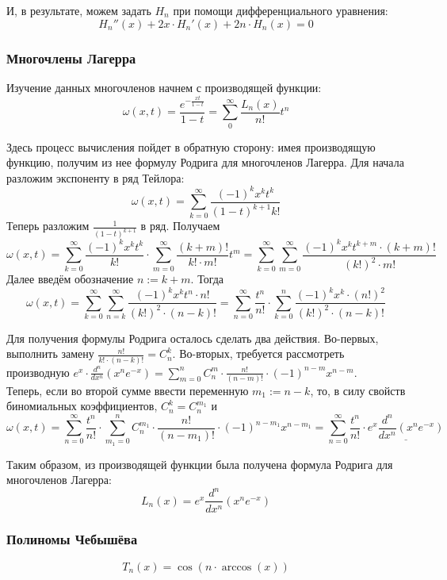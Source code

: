 \documentclass[12pt]{article}
\begin{document}
	И, в результате, можем задать $H_n$ при помощи дифференциального уравнения:
	$$H_n''(x) + 2x \cdot H_n'(x) + 2n \cdot H_n(x) = 0$$
	
	\subsubsection{Многочлены Лагерра}
	
	Изучение данных многочленов начнем с производящей функции:
	$$ \omega(x,t) = \frac{e^{-\frac{xt}{1-t}}}{1 - t} = \sum_0^{\infty} \frac{L_n(x)}{n!} t^n$$
	
	Здесь процесс вычисления пойдет в обратную сторону: имея производящую функцию, получим из нее формулу Родрига для
	многочленов Лагерра. Для начала разложим экспоненту в ряд Тейлора:
	$$ \omega(x,t) = \sum_{k=0}^{\infty} \frac{(-1)^k x^k t^k}{(1-t)^{k+1} k!}$$
	Теперь разложим $\frac{1}{(1-t)^{k+1}}$ в ряд. Получаем
	$$ \omega(x,t) = \sum_{k=0}^{\infty} \frac{(-1)^k x^k t^k}{k!} \cdot \sum_{m=0}^{\infty} \frac{(k+m)!}{k! \cdot m!} t^m
	 = \sum_{k=0}^{\infty} \sum_{m=0}^{\infty} \frac{(-1)^k x^k t^{k+m} \cdot (k+m)!}{(k!)^2 \cdot m!} $$
	Далее введём обозначение $n := k+m$. Тогда
	$$ \omega(x,t) = \sum_{k=0}^{\infty} \sum_{n=k}^{\infty} \frac{(-1)^k x^k t^n \cdot n!}{(k!)^2 \cdot (n-k)!}
	 = \sum_{n=0}^{\infty} \frac{t^n}{n!} \cdot \sum_{k=0}^{n} \frac{(-1)^k x^k \cdot (n!)^2}{(k!)^2 \cdot (n-k)!}$$
	 
	Для получения формулы Родрига осталось сделать два действия. Во-первых, выполнить замену $\frac{n!}{k! \cdot (n-k)!} = C_n^k$.
	Во-вторых, требуется рассмотреть производную $e^x \cdot \frac{d^n}{dx^n}(x^n e^{-x}) 
	= \sum_{m=0}^n C_n^m \cdot \frac{n!}{(n-m)!} \cdot (-1)^{n-m} x^{n-m}$. \\
	Теперь, если во второй сумме ввести переменную $m_1 := n - k$, то, в силу свойств биномиальных коэффициентов, $C_n^k = C_n^{m_1}$ и
	$$\omega(x,t) = \sum_{n=0}^{\infty} \frac{t^n}{n!} \cdot \sum_{m_1=0}^{n} C_n^{m_1} \cdot \frac{n!}{(n-m_1)!}
	\cdot (-1)^{n-m_1} x^{n-m_1} = \sum_{n=0}^{\infty} \frac{t^n}{n!} \cdot \underline{e^x \frac{d^n}{dx^n}(x^n e^{-x})}$$
	
	Таким образом, из производящей функции была получена формула Родрига для многочленов Лагерра:
	$$L_n(x) = e^x \frac{d^n}{dx^n}(x^n e^{-x})$$
	
	\subsubsection{Полиномы Чебышёва}
	$$T_n(x) = \cos(n \cdot \arccos(x))$$
\end{document}
